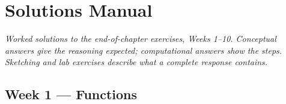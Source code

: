 \documentclass[12pt]{book}
\begin{document}
\chapter*{Solutions Manual}

\bigskip
\noindent\textit{Worked solutions to the end-of-chapter exercises, Weeks 1--10.
Conceptual answers give the reasoning expected; computational answers show the steps.
Sketching and lab exercises describe what a complete response contains.}

\section*{Week 1 — Functions}
\setcounter{section}{1}
\end{document}
